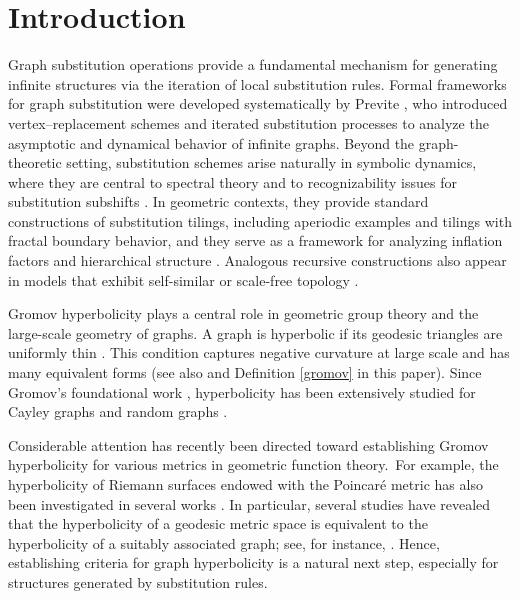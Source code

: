 \documentclass[reqno]{amsart}
\theoremstyle{plain}
\numberwithin{equation}{section}
\begin{document}
\maketitle

\section{Introduction}

Graph substitution operations provide a fundamental mechanism for generating
infinite structures via the iteration of local substitution rules. Formal
frameworks for graph substitution were developed systematically by Previte 
\cite{Previte}, who introduced vertex--replacement schemes and iterated
substitution processes to analyze the asymptotic and dynamical behavior of
infinite graphs. Beyond the graph-theoretic setting, substitution schemes
arise naturally in symbolic dynamics, where they are central to spectral
theory and to recognizability issues for substitution subshifts \cite%
{Queffelec,Fogg,Mosse}. In geometric contexts, they provide standard
constructions of substitution tilings, including aperiodic examples and
tilings with fractal boundary behavior, and they serve as a framework for
analyzing inflation factors and hierarchical structure \cite%
{Mozes,Frank,Smilansky,Frettloh}. Analogous recursive constructions also
appear in models that exhibit self-similar or scale-free topology \cite%
{Chilakamarri,Li}.

Gromov hyperbolicity plays a central role in geometric group theory and the
large-scale geometry of graphs. A graph is hyperbolic if its geodesic
triangles are uniformly thin \cite{Gromov}. This condition captures negative
curvature at large scale and has many equivalent forms (see also \cite{Woess}
and Definition \ref{gromov} in this paper). Since Gromov's foundational work 
\cite{Gromov}, hyperbolicity has been extensively studied for Cayley graphs 
\cite{Meier} and random graphs \cite{Mitsche}.

Considerable attention has recently been directed toward establishing Gromov
hyperbolicity for various metrics in geometric function theory.\ For
example, the hyperbolicity of Riemann surfaces endowed with the Poincar\'{e}
metric has also been investigated in several works \cite%
{Hasto2006,Balogh,Hasto2010,Hasto2011}. In particular, several studies have
revealed that the hyperbolicity of a geodesic metric space is equivalent to
the hyperbolicity of a suitably associated graph; see, for instance, \cite%
{Rodriguez2004,Portilla,Rodriguez2007,Bermudo}. Hence, establishing criteria
for graph hyperbolicity is a natural next step, especially for structures
generated by substitution rules.
\end{document}
